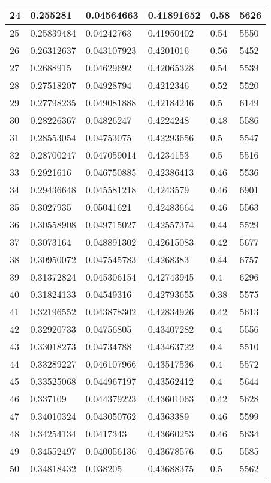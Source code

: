 \begin{longtable}{|l|l|l|l|l|l|}
24 & 0.255281 & 0.04564663 & 0.41891652 & 0.58 & 5626 \\ \hline 
25 & 0.25839484 & 0.04242763 & 0.41950402 & 0.54 & 5550 \\ \hline 
26 & 0.26312637 & 0.043107923 & 0.4201016 & 0.56 & 5452 \\ \hline 
27 & 0.2688915 & 0.04629692 & 0.42065328 & 0.54 & 5539 \\ \hline 
28 & 0.27518207 & 0.04928794 & 0.4212346 & 0.52 & 5520 \\ \hline 
29 & 0.27798235 & 0.049081888 & 0.42184246 & 0.5 & 6149 \\ \hline 
30 & 0.28226367 & 0.04826247 & 0.4224248 & 0.48 & 5586 \\ \hline 
31 & 0.28553054 & 0.04753075 & 0.42293656 & 0.5 & 5547 \\ \hline 
32 & 0.28700247 & 0.047059014 & 0.4234153 & 0.5 & 5516 \\ \hline 
33 & 0.2921616 & 0.046750885 & 0.42386413 & 0.46 & 5536 \\ \hline 
34 & 0.29436648 & 0.045581218 & 0.4243579 & 0.46 & 6901 \\ \hline 
35 & 0.3027935 & 0.05041621 & 0.42483664 & 0.46 & 5563 \\ \hline 
36 & 0.30558908 & 0.049715027 & 0.42557374 & 0.44 & 5529 \\ \hline 
37 & 0.3073164 & 0.048891302 & 0.42615083 & 0.42 & 5677 \\ \hline 
38 & 0.30950072 & 0.047545783 & 0.4268383 & 0.44 & 6757 \\ \hline 
39 & 0.31372824 & 0.045306154 & 0.42743945 & 0.4 & 6296 \\ \hline 
40 & 0.31824133 & 0.04549316 & 0.42793655 & 0.38 & 5575 \\ \hline 
41 & 0.32196552 & 0.043878302 & 0.42834926 & 0.42 & 5613 \\ \hline 
42 & 0.32920733 & 0.04756805 & 0.43407282 & 0.4 & 5556 \\ \hline 
43 & 0.33018273 & 0.04734788 & 0.43463722 & 0.4 & 5510 \\ \hline 
44 & 0.33289227 & 0.046107966 & 0.43517536 & 0.4 & 5572 \\ \hline 
45 & 0.33525068 & 0.044967197 & 0.43562412 & 0.4 & 5644 \\ \hline 
46 & 0.337109 & 0.044379223 & 0.43601063 & 0.42 & 5628 \\ \hline 
47 & 0.34010324 & 0.043050762 & 0.4363389 & 0.46 & 5599 \\ \hline 
48 & 0.34254134 & 0.0417343 & 0.43660253 & 0.46 & 5634 \\ \hline 
49 & 0.34552497 & 0.040056136 & 0.43678576 & 0.5 & 5585 \\ \hline 
50 & 0.34818432 & 0.038205 & 0.43688375 & 0.5 & 5562 \\ \hline 
\end{longtable}